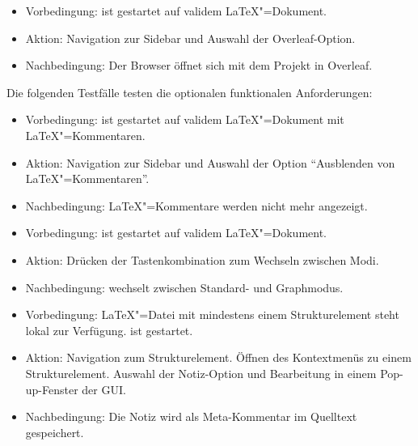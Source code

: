 \begin{itemize}
\item Vorbedingung: \texla{} ist gestartet auf validem \LaTeX"=Dokument.
  \item Aktion: Navigation zur Sidebar und Auswahl der Overleaf-Option.
  \item Nachbedingung: Der Browser öffnet sich mit dem Projekt in Overleaf.

\end{itemize}
Die folgenden Testfälle testen die optionalen funktionalen Anforderungen:


\begin{itemize}
\item Vorbedingung: \texla{} ist gestartet auf validem \LaTeX"=Dokument mit \LaTeX"=Kommentaren.
  \item Aktion: Navigation zur Sidebar und Auswahl der Option \enquote{Ausblenden von \LaTeX"=Kommentaren}.
  \item Nachbedingung: \LaTeX"=Kommentare werden nicht mehr angezeigt.

\end{itemize}

\begin{itemize}
\item Vorbedingung: \texla{} ist gestartet auf validem \LaTeX"=Dokument.
  \item Aktion: Drücken der Tastenkombination zum Wechseln zwischen Modi.
  \item Nachbedingung: \texla{} wechselt zwischen Standard- und Graphmodus.

\end{itemize}

\begin{itemize}
\item Vorbedingung: \LaTeX"=Datei mit mindestens einem Strukturelement steht lokal zur Verfügung.
  \texla{} ist gestartet.
  \item Aktion: Navigation zum Strukturelement.
  Öffnen des Kontextmenüs zu einem Strukturelement.
  Auswahl der Notiz-Option und Bearbeitung in einem Pop-up-Fenster der GUI.
  \item Nachbedingung: Die Notiz wird als Meta-Kommentar im Quelltext gespeichert.

\end{itemize}

